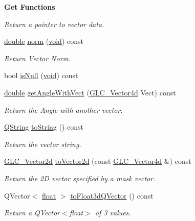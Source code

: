 \begin{Indent}{\bf Get Functions}
\begin{DoxyCompactItemize}
\begin{DoxyCompactList}\small\item\em Return a pointer to vector data. \end{DoxyCompactList}\item 
\hyperlink{_super_l_u_support_8h_a8956b2b9f49bf918deed98379d159ca7}{double} \hyperlink{class_g_l_c___vector4d_a79ce11d81a878693fc1a9dd63d869fc4}{norm} (\hyperlink{group___u_a_v_objects_plugin_ga444cf2ff3f0ecbe028adce838d373f5c}{void}) const 
\begin{DoxyCompactList}\small\item\em Return Vector Norm. \end{DoxyCompactList}\item 
bool \hyperlink{class_g_l_c___vector4d_ab1f98ab2e364617719d0193813a9191b}{is\-Null} (\hyperlink{group___u_a_v_objects_plugin_ga444cf2ff3f0ecbe028adce838d373f5c}{void}) const 
\item 
\hyperlink{_super_l_u_support_8h_a8956b2b9f49bf918deed98379d159ca7}{double} \hyperlink{class_g_l_c___vector4d_aa3ae170883d4457e24105058897b11dd}{get\-Angle\-With\-Vect} (\hyperlink{class_g_l_c___vector4d}{G\-L\-C\-\_\-\-Vector4d} Vect) const 
\begin{DoxyCompactList}\small\item\em Return the Angle with another vector. \end{DoxyCompactList}\item 
\hyperlink{group___u_a_v_objects_plugin_gab9d252f49c333c94a72f97ce3105a32d}{Q\-String} \hyperlink{class_g_l_c___vector4d_a5dd14c58129e3440775297f88c6fc13c}{to\-String} () const 
\begin{DoxyCompactList}\small\item\em Return the vector string. \end{DoxyCompactList}\item 
\hyperlink{class_g_l_c___vector2d}{G\-L\-C\-\_\-\-Vector2d} \hyperlink{class_g_l_c___vector4d_af9dd7e8331b0e3a4ec2680e6e33efb7f}{to\-Vector2d} (const \hyperlink{class_g_l_c___vector4d}{G\-L\-C\-\_\-\-Vector4d} \&) const 
\begin{DoxyCompactList}\small\item\em Return the 2\-D vector specified by a mask vector. \end{DoxyCompactList}\item 
Q\-Vector$<$ \hyperlink{_super_l_u_support_8h_a6a1bb6ed41f44b60e7bd83b0e9945aa7}{float} $>$ \hyperlink{class_g_l_c___vector4d_ad54a56951624bb0c338027d318fa82e6}{to\-Float3d\-Q\-Vector} () const 
\begin{DoxyCompactList}\small\item\em Return a Q\-Vector$<$float$>$ of 3 values. \end{DoxyCompactList}\end{DoxyCompactItemize}
\end{Indent}
